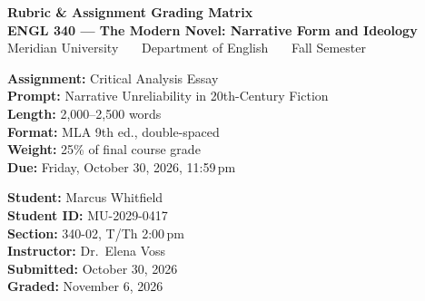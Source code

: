 \documentclass[11pt,a4paper]{scrartcl}
\begin{document}
\begin{tcolorbox}[colback=inkblue,colframe=inkblue,arc=0pt,boxrule=0pt,left=16pt,right=16pt,top=11pt,bottom=11pt]
{\color{white}\sffamily\bfseries\LARGE Rubric \& Assignment Grading Matrix}\\[3pt]
{\color{gold}\sffamily\bfseries\large ENGL 340 --- The Modern Novel: Narrative Form and Ideology}\\[5pt]
{\color{white}\sffamily\small Meridian University \ \textbullet\ \ Department of English \ \textbullet\ \ Fall Semester}
\end{tcolorbox}

\vspace{4mm}

\noindent
\begin{minipage}[t]{0.48\linewidth}
\begin{tcolorbox}[colback=paper,colframe=inkblue,boxrule=0.7pt,arc=2pt,
  title={\faFile\ \ Assignment Details},coltitle=white,colbacktitle=inkblue,
  fonttitle=\sffamily\bfseries\small,left=9pt,right=9pt,top=5pt,bottom=5pt]
\small
\textbf{Assignment:} Critical Analysis Essay\\
\textbf{Prompt:} Narrative Unreliability in 20th-Century Fiction\\
\textbf{Length:} 2{,}000--2{,}500 words\\
\textbf{Format:} MLA 9th ed., double-spaced\\
\textbf{Weight:} 25\% of final course grade\\
\textbf{Due:} Friday, October 30, 2026, 11:59\,pm
\end{tcolorbox}
\end{minipage}\hfill%
\begin{minipage}[t]{0.48\linewidth}
\begin{tcolorbox}[colback=paper,colframe=inkblue,boxrule=0.7pt,arc=2pt,
  title={\faUser\ \ Student \& Submission},coltitle=white,colbacktitle=inkblue,
  fonttitle=\sffamily\bfseries\small,left=9pt,right=9pt,top=5pt,bottom=5pt]
\small
\textbf{Student:} Marcus Whitfield\\
\textbf{Student ID:} MU-2029-0417\\
\textbf{Section:} 340-02, T/Th 2:00\,pm\\
\textbf{Instructor:} Dr.\ Elena Voss\\
\textbf{Submitted:} October 30, 2026\\
\textbf{Graded:} November 6, 2026
\end{tcolorbox}
\end{minipage}
\par
\end{document}
